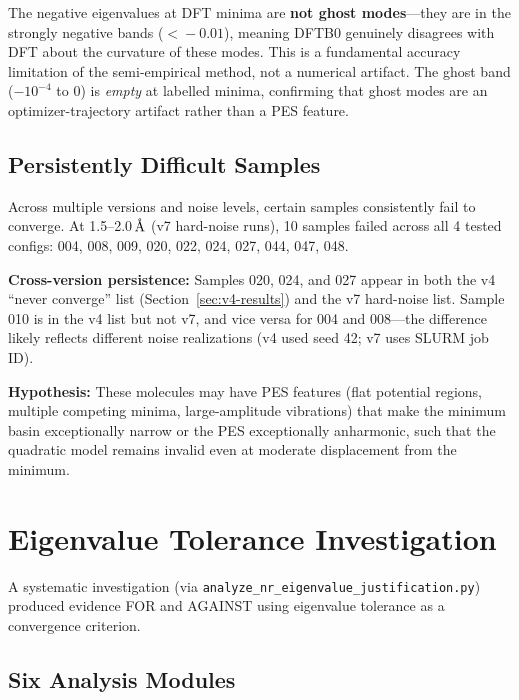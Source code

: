 \documentclass[11pt,a4paper]{article}
\newcommand{\angstrom}{\text{\r{A}}}
\begin{document}
The negative eigenvalues at DFT minima are \textbf{not ghost modes}---they are in the strongly negative bands ($<\!-0.01$), meaning DFTB0 genuinely disagrees with DFT about the curvature of these modes. This is a fundamental accuracy limitation of the semi-empirical method, not a numerical artifact. The ghost band ($-10^{-4}$ to $0$) is \emph{empty} at labelled minima, confirming that ghost modes are an optimizer-trajectory artifact rather than a PES feature.

\subsection{Persistently Difficult Samples}
\label{sec:hard-samples}

Across multiple versions and noise levels, certain samples consistently fail to converge. At 1.5--2.0\,$\angstrom$ (v7 hard-noise runs), 10 samples failed across all 4 tested configs: 004, 008, 009, 020, 022, 024, 027, 044, 047, 048.

\textbf{Cross-version persistence:} Samples 020, 024, and 027 appear in both the v4 ``never converge'' list (Section~\ref{sec:v4-results}) and the v7 hard-noise list. Sample 010 is in the v4 list but not v7, and vice versa for 004 and 008---the difference likely reflects different noise realizations (v4 used seed 42; v7 uses SLURM job ID).

\textbf{Hypothesis:} These molecules may have PES features (flat potential regions, multiple competing minima, large-amplitude vibrations) that make the minimum basin exceptionally narrow or the PES exceptionally anharmonic, such that the quadratic model remains invalid even at moderate displacement from the minimum.

\section{Eigenvalue Tolerance Investigation}
\label{sec:eval-tolerance}

A systematic investigation (via \texttt{analyze\_nr\_eigenvalue\_justification.py}) produced evidence FOR and AGAINST using eigenvalue tolerance as a convergence criterion.

\subsection{Six Analysis Modules}
\end{document}
